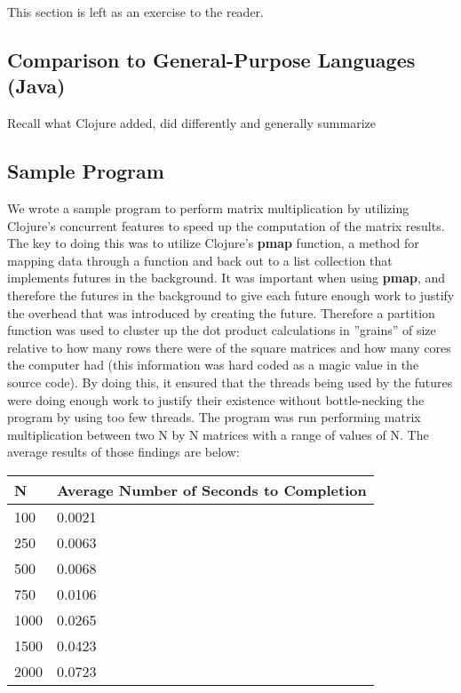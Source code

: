     This section is left as an exercise to the reader.

\subsection{Comparison to General-Purpose Languages (Java)}

    Recall what Clojure added, did differently and generally summarize

\subsection{Sample Program}

    We wrote a sample program to perform matrix multiplication by utilizing Clojure's concurrent features to speed up the computation of the matrix results. The key to doing this was to utilize Clojure's \textbf{pmap} function, a method for mapping data through a function and back out to a list collection that implements futures in the background. \cite{ClojureDocumentation_pmap} It was important when using \textbf{pmap}, and therefore the futures in the background to give each future enough work to justify the overhead that was introduced by creating the future. Therefore a partition function was used to cluster up the dot product calculations in ''grains'' of size relative to how many rows there were of the square matrices and how many cores the computer had (this information was hard coded as a magic value in the source code).
    By doing this, it ensured that the threads being used by the futures were doing enough work to justify their existence without bottle-necking the program by using too few threads. The program was run performing matrix multiplication between two N by N matrices with a range of values of N. The average results of those findings are below:
    
    \begin{center}
    \begin{tabular}{ | m{5em} | m{10em} | }  
    \hline
    N & Average Number of Seconds to Completion \\ [0.5ex] 
    \hline\hline
    100 & 0.0021 \\ \hline
    250 & 0.0063 \\ \hline
    500 & 0.0068 \\ \hline
    750 & 0.0106 \\ \hline
    1000 & 0.0265 \\ \hline
    1500 & 0.0423 \\ \hline
    2000 & 0.0723 \\ [1ex] 
    \hline
    \end{tabular}
    \end{center}
    
